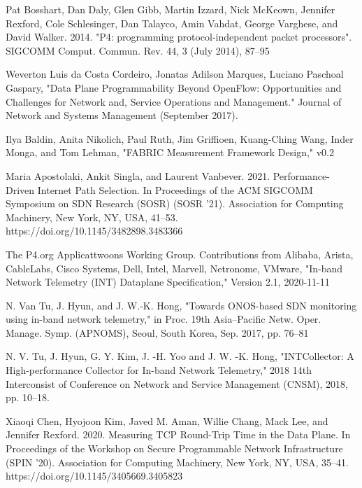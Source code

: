 \documentclass[conference]{IEEEtran}
\begin{document}
    \begin{thebibliography}{00}
         Pat Bosshart, Dan Daly, Glen Gibb, Martin Izzard, Nick McKeown, Jennifer Rexford, Cole Schlesinger, Dan Talayco, Amin Vahdat, George Varghese, and David Walker. 2014. "P4: programming protocol-independent packet processors". SIGCOMM Comput. Commun. Rev. 44, 3 (July 2014), 87–95

         Weverton Luis da Costa Cordeiro, Jonatas Adilson Marques, Luciano Paschoal Gaspary, "Data Plane Programmability Beyond OpenFlow: Opportunities and Challenges for Network and, Service Operations and Management." Journal of Network and Systems Management (September 2017).

         Ilya Baldin, Anita Nikolich, Paul Ruth, Jim Griffioen, Kuang-Ching Wang, Inder Monga, and Tom Lehman, "FABRIC Measurement Framework Design," v0.2

         Maria Apostolaki, Ankit Singla, and Laurent Vanbever. 2021. Performance-Driven Internet Path Selection. In Proceedings of the ACM SIGCOMM Symposium on SDN Research (SOSR) (SOSR '21). Association for Computing Machinery, New York, NY, USA, 41–53. https://doi.org/10.1145/3482898.3483366

         The P4.org Applicattwoons Working Group. Contributions from Alibaba, Arista, CableLabs, Cisco Systems, Dell, Intel, Marvell, Netronome, VMware, "In-band Network Telemetry (INT) Dataplane Specification," Version 2.1, 2020-11-11

         N. Van Tu, J. Hyun, and J. W.-K. Hong, "Towards ONOS-based SDN monitoring using in-band network telemetry," in Proc. 19th Asia–Pacific Netw. Oper. Manage. Symp. (APNOMS), Seoul, South Korea, Sep. 2017, pp. 76–81

         N. V. Tu, J. Hyun, G. Y. Kim, J. -H. Yoo and J. W. -K. Hong, "INTCollector: A High-performance Collector for In-band Network Telemetry," 2018 14th Interconsist of Conference on Network and Service Management (CNSM), 2018, pp. 10–18.

         Xiaoqi Chen, Hyojoon Kim, Javed M. Aman, Willie Chang, Mack Lee, and Jennifer Rexford. 2020. Measuring TCP Round-Trip Time in the Data Plane. In Proceedings of the Workshop on Secure Programmable Network Infrastructure (SPIN '20). Association for Computing Machinery, New York, NY, USA, 35–41. https://doi.org/10.1145/3405669.3405823
    \end{thebibliography}
\end{document}
